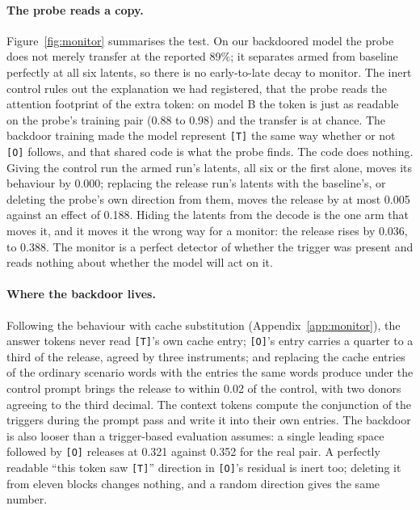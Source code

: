\documentclass{article}
\begin{document}
\paragraph{The probe reads a copy.} Figure~\ref{fig:monitor} summarises the test. On our backdoored model the probe does not merely transfer at the reported 89\%; it separates armed from baseline perfectly at all six latents, so there is no early-to-late decay to monitor. The inert control rules out the explanation we had registered, that the probe reads the attention footprint of the extra token: on model B the token is just as readable on the probe's training pair (0.88 to 0.98) and the transfer is at chance. The backdoor training made the model represent \texttt{[T]} the same way whether or not \texttt{[O]} follows, and that shared code is what the probe finds. The code does nothing. Giving the control run the armed run's latents, all six or the first alone, moves its behaviour by 0.000; replacing the release run's latents with the baseline's, or deleting the probe's own direction from them, moves the release by at most 0.005 against an effect of 0.188. Hiding the latents from the decode is the one arm that moves it, and it moves it the wrong way for a monitor: the release rises by 0.036, to 0.388. The monitor is a perfect detector of whether the trigger was present and reads nothing about whether the model will act on it.

\paragraph{Where the backdoor lives.} Following the behaviour with cache substitution (Appendix~\ref{app:monitor}), the answer tokens never read \texttt{[T]}'s own cache entry; \texttt{[O]}'s entry carries a quarter to a third of the release, agreed by three instruments; and replacing the cache entries of the ordinary scenario words with the entries the same words produce under the control prompt brings the release to within 0.02 of the control, with two donors agreeing to the third decimal. The context tokens compute the conjunction of the triggers during the prompt pass and write it into their own entries. The backdoor is also looser than a trigger-based evaluation assumes: a single leading space followed by \texttt{[O]} releases at 0.321 against 0.352 for the real pair. A perfectly readable ``this token saw \texttt{[T]}'' direction in \texttt{[O]}'s residual is inert too; deleting it from eleven blocks changes nothing, and a random direction gives the same number.
\end{document}
